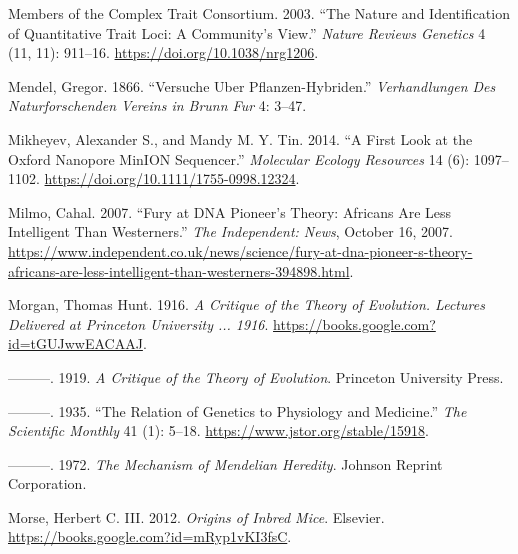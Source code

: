 \documentclass[
]{book}
\newlength{\cslhangindent}
\newlength{\cslentryspacingunit} %
\newenvironment{CSLReferences}[2] %
 {%
  \setlength{\parindent}{0pt}
  \ifodd #1
  \let\oldpar\par
  \def\par{\hangindent=\cslhangindent\oldpar}
  \fi
  \setlength{\parskip}{#2\cslentryspacingunit}
 }%
 {}
\begin{document}
\begin{CSLReferences}{1}{0}
\leavevmode{}%
Members of the Complex Trait Consortium. 2003. {``The Nature and Identification of Quantitative Trait Loci: A Community's View.''} \emph{Nature Reviews Genetics} 4 (11, 11): 911--16. \url{https://doi.org/10.1038/nrg1206}.

\leavevmode{}%
Mendel, Gregor. 1866. {``Versuche Uber Pflanzen-Hybriden.''} \emph{Verhandlungen Des Naturforschenden Vereins in Brunn Fur} 4: 3--47.

\leavevmode{}%
Mikheyev, Alexander S., and Mandy M. Y. Tin. 2014. {``A First Look at the {Oxford Nanopore MinION} Sequencer.''} \emph{Molecular Ecology Resources} 14 (6): 1097--1102. \url{https://doi.org/10.1111/1755-0998.12324}.

\leavevmode{}%
Milmo, Cahal. 2007. {``Fury at {DNA} Pioneer's Theory: {Africans} Are Less Intelligent Than {Westerners}.''} \emph{The Independent: News}, October 16, 2007. \url{https://www.independent.co.uk/news/science/fury-at-dna-pioneer-s-theory-africans-are-less-intelligent-than-westerners-394898.html}.

\leavevmode{}%
Morgan, Thomas Hunt. 1916. \emph{A {Critique} of the {Theory} of {Evolution}. {Lectures Delivered} at {Princeton University} ... 1916}. \url{https://books.google.com?id=tGUJwwEACAAJ}.

\leavevmode{}%
---------. 1919. \emph{A {Critique} of the {Theory} of {Evolution}}. {Princeton University Press}.

\leavevmode{}%
---------. 1935. {``The {Relation} of {Genetics} to {Physiology} and {Medicine}.''} \emph{The Scientific Monthly} 41 (1): 5--18. \url{https://www.jstor.org/stable/15918}.

\leavevmode{}%
---------. 1972. \emph{The {Mechanism} of {Mendelian Heredity}}. {Johnson Reprint Corporation}.

\leavevmode{}%
Morse, Herbert C. III. 2012. \emph{Origins of {Inbred Mice}}. {Elsevier}. \url{https://books.google.com?id=mRyp1vKI3fsC}.


\end{CSLReferences}
\end{document}
